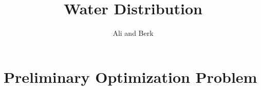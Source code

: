 \documentclass[12pt]{article}
\begin{document}
	
	
	
	\title{Water Distribution}%
	\author{Ali and Berk\\ %
	} %
	
	\maketitle
	
	\section{Preliminary Optimization Problem}
	
\end{document}
